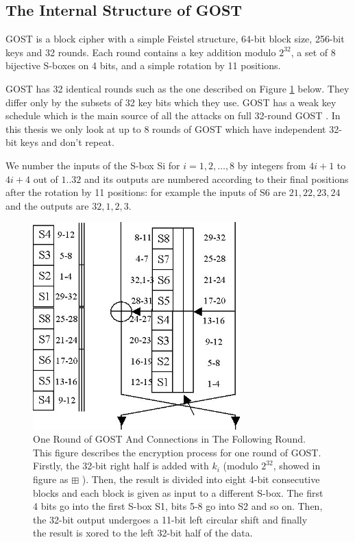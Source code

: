 \subsection{The Internal Structure of GOST} \label{sec:GOSTStructure}
GOST is a block cipher with a simple Feistel structure,
64-bit block size, 256-bit keys and 32 rounds.
Each round contains a key addition modulo $2^{32}$,
a set of 8 bijective S-boxes on 4 bits,
and a simple rotation by 11 positions.

GOST has 32 identical rounds such as the one described on Figure \ref{GostRoundAndConnections} below.
They differ only by the subsets of 32 key bits which they use. GOST has a weak key schedule which is the main source of all the attacks on full 32-round GOST \cite{gostreport,gostac,JapaneseGOSTMITMFSE2011,gostdcpp1,gostdc0,gostdc1,gostdc2,DunkelmanImprovedGOST8R}.  
In this thesis we only look at up to 8 rounds of GOST which have independent 32-bit keys and don't repeat.

We number the inputs of the S-box Si for $i=1,2,\ldots,8$ by integers from $4i+1$ to $4i+4$ out of $1..32$ and its outputs are numbered according to their final positions after the rotation by 11 positions: for example the inputs of S6 are $21,22,23,24$ and the outputs are $32,1,2,3$.


\begin{figure}[h] 
	\centering
	\includegraphics[width=80mm]{./pics/gostfeist2.jpg}
	
	\caption[One Round of GOST And Connections in The Following Round] {One Round of GOST And Connections in The Following Round. This figure describes the encryption process for one round of GOST. Firstly, the 32-bit right half is added with $k_{i}$ (modulo $2^{32}$, showed in figure as  $\boxplus$ ). Then, the result is divided into eight 4-bit consecutive blocks and each block is given as input to a different S-box. The first 4 bits go into the first S-box S1, bits 5-8 go into S2 and so on. Then, the 32-bit output undergoes a 11-bit left circular shift and finally the result is xored to the left 32-bit half of the data.}
	\label{GostRoundAndConnections}
\end{figure}

